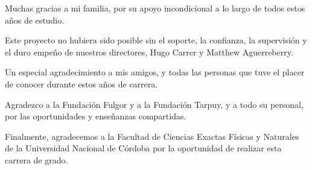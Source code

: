 \documentclass[
12pt, %
spanish, %
singlespacing, %
headsepline, %
]{MastersDoctoralThesis} %
\begin{document}
\begin{acknowledgements}
	
	\addchaptertocentry{\acknowledgementname} %

	Muchas gracias a mi familia, por su apoyo incondicional a lo largo de todos estos años de estudio.  
	\bigskip
			
	Este proyecto no hubiera sido posible sin el soporte, la confianza, la supervisión y el duro empeño de nuestros directores, Hugo Carrer y Matthew Aguerreberry.
	\bigskip
			
	Un especial agradecimiento a mis amigos, y todas las personas que tuve el placer de conocer durante estos años de carrera.
	\bigskip
		
	Agradezco a la Fundación Fulgor y a la Fundación Tarpuy, y a todo su personal, por las oportunidades y enseñanzas compartidas.
	\bigskip
			
	Finalmente, agradecemos a la Facultad de Ciencias Exactas Físicas y Naturales de la Universidad Nacional de Córdoba por la oportunidad de realizar esta carrera de grado.

	\vspace*{\fill}
		
\end{acknowledgements}


\hypersetup{
	linkcolor=black,
	citecolor=black,
	urlcolor=black
	}

\tableofcontents %

\listoffigures %

\listoftables %

\end{document}

